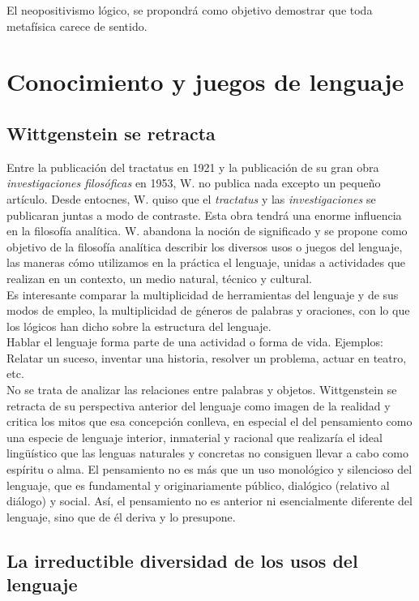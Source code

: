 \documentclass[a4paper, 11pt, twocolumn, spanish]{article}
\begin{document}
El neopositivismo lógico, se propondrá como objetivo demostrar que
toda metafísica carece de sentido.

\section{Conocimiento y juegos de lenguaje}
\label{sec:org8a61c20}
\subsection{Wittgenstein se retracta}
\label{sec:orgd101e36}
Entre la publicación del tractatus en 1921 y la publicación de su gran
obra \emph{investigaciones filosóficas} en 1953, W. no publica nada excepto
un pequeño artículo. Desde entocnes, W. quiso que el \emph{tractatus} y las
\emph{investigaciones} se publicaran juntas a modo de contraste. Esta obra
tendrá una enorme influencia en la filosofía analítica. W. abandona la
noción de significado y se propone como objetivo de la filosofía
analítica describir los diversos usos o juegos del lenguaje, las
maneras cómo utilizamos en la práctica el lenguaje, unidas a
actividades que realizan en un contexto, un medio natural, técnico y
cultural.\\

Es interesante comparar la multiplicidad de herramientas del lenguaje
y de sus modos de empleo, la multiplicidad de géneros de palabras y
oraciones, con lo que los lógicos han dicho sobre la estructura del
lenguaje.\\
Hablar el lenguaje forma parte de una actividad o forma de
vida. Ejemplos: Relatar un suceso, inventar una historia, resolver un
problema, actuar en teatro, etc.\\

No se trata de analizar las relaciones entre palabras y
objetos. Wittgenstein se retracta de su perspectiva anterior del
lenguaje como imagen de la realidad y critica los mitos que esa
concepción conlleva, en especial el del pensamiento como una especie
de lenguaje interior, inmaterial y racional que realizaría el ideal
lingüístico que las lenguas naturales y concretas no consiguen llevar
a cabo como espíritu o alma. El pensamiento no es más que un uso
monológico y silencioso del lenguaje, que es fundamental y
originariamente público, dialógico (relativo al diálogo) y
social. Así, el pensamiento no es anterior ni esencialmente diferente
del lenguaje, sino que de él deriva y lo presupone.

\subsection{La irreductible diversidad de los usos del lenguaje}
\label{sec:orgb20e8ad}
\end{document}
